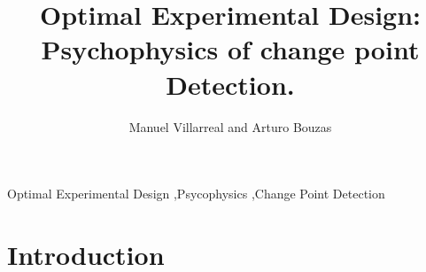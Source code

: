 \documentclass[preprint,review,12pt]{elsarticle}
\begin{document}
\begin{frontmatter}


\title{Optimal Experimental Design: Psychophysics of change point Detection.}




\author{Manuel Villarreal and Arturo Bouzas}

\address{Mexico City, Mexico}

\begin{abstract}
\end{abstract}

\begin{keyword}
Optimal Experimental Design \sep Psycophysics \sep Change Point Detection


\end{keyword}

\end{frontmatter}

\linenumbers

\section{Introduction}
\label{S:1}

\end{document}
